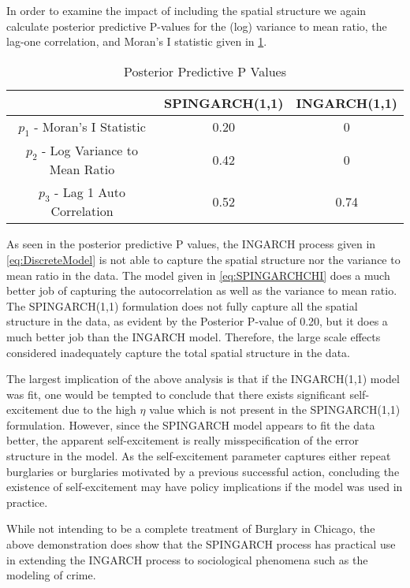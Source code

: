 \documentclass[11pt]{isuthesis}
\begin{document}
In order to examine the impact of including the spatial structure we again calculate posterior predictive P-values for the (log) variance to mean ratio, the lag-one correlation, and Moran's I statistic given in \ref{Table:Pvals}.  
\begin{table}[h]
	\caption {Posterior Predictive P Values} \label{Table:Pvals} 
	\begin{center}
		\begin{tabular}{ |c|c|c| } 
			\hline
			& SPINGARCH(1,1) & INGARCH(1,1)\\
			\hline 
			$p_1$ - Moran's I Statistic& 0.20 & 0 \\
			$p_2$ - Log Variance to Mean Ratio & 0.42 & 0\\
			$p_3$ - Lag 1 Auto Correlation & 0.52 & 0.74 \\ 
			\hline
		\end{tabular}
	\end{center}
\end{table}
As seen in the posterior predictive P values, the INGARCH process given in \eqref{eq:DiscreteModel} is not able to capture the spatial structure nor the variance to mean ratio in the data.  The model given in \eqref{eq:SPINGARCHCHI} does a much better job of capturing the autocorrelation as well as the variance to mean ratio.  The SPINGARCH(1,1) formulation does not fully capture all the spatial structure in the data, as evident by the Posterior P-value of 0.20, but it does a much better job than the INGARCH model.  Therefore, the large scale effects considered inadequately capture the total spatial structure in the data. 

The largest implication of the above analysis is that if the INGARCH(1,1) model was fit, one would be tempted to conclude that there exists significant self-excitement due to the high $\eta$ value which is not present in the SPINGARCH(1,1) formulation.   However, since the SPINGARCH model appears to fit the data better, the apparent self-excitement is really misspecification of the error structure in the model.  As the self-excitement parameter captures either repeat burglaries or burglaries motivated by a previous successful action, concluding the existence of self-excitement may have policy implications if the model was used in practice. 

While not intending to be a complete treatment of Burglary in Chicago, the above demonstration does show that the SPINGARCH process has practical use in extending the INGARCH process to sociological phenomena such as the modeling of crime.
\end{document}
